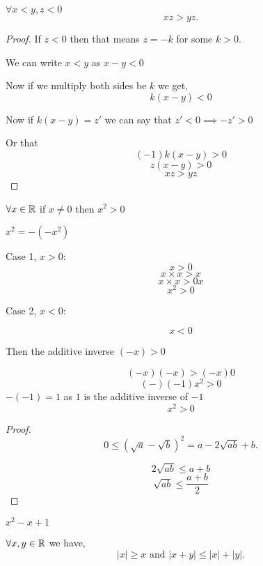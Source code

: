 \begin{theorem}
    $\forall x < y, z < 0$  \[
    xz > yz
    .\] 
\end{theorem}
\begin{proof}

    If $z < 0$ then that means  $z = -k$ for some  $k > 0$.

    We can write $x < y $ as  $x - y < 0$

    Now if we multiply both sides be $k$ we get, 
    $$ k(x - y) < 0 $$ 

    Now if $k (x - y) = z'$  we can say that $z' < 0 \implies -z' > 0$

    Or that  
    $$ (-1)k(x-y) > 0$$ 
    $$z(x-y) > 0$$ 
    $$ xz > yz $$ 

\end{proof}

\begin{theorem}
    $\forall x \in \mathbb{R}$ if $x \neq 0$ then  $x^2> 0$
\end{theorem}

\begin{theorem}
    $x^2 = - (-x^2)$

    Case 1, $x > 0$: 
    $$x > 0$$
    $$x\times x > x$$
    $$x\times x > 0x$$
    $$ x^2 > 0$$
    
    Case 2, $x < 0$:
    
    $$ x < 0 $$ 
    
    Then the additive inverse $(-x) > 0$
     
    $$ (-x)(-x) > (-x)0 $$ 
    $$ (-)(-1)x^2 > 0 $$ 
    $-(-1) = 1$ as  $1$ is the additive inverse of $-1$
    $$ x^2 > 0 $$ 

\end{theorem}


\begin{proof}
    \[
        0 \leq (\sqrt{a} - \sqrt{b})^2 = a - 2\sqrt{ab} + b
    .\]      
    
    $$2\sqrt{ab} \le a + b$$
    $$\sqrt{ab} \le \frac{a + b}{2}$$
\end{proof}

\begin{eg}
    $x^2 - x + 1$
\end{eg}



\begin{theorem}
    $\forall x,y \in \mathbb{R}$ we have,  \[
        |x| \geq x \text{ and } |x + y| \leq |x| + |y|
    .\] 

\end{theorem}

